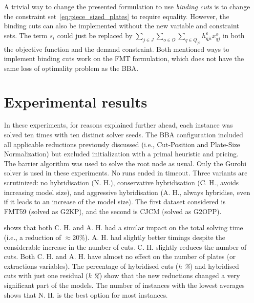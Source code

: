 \documentclass[ppgc,tese,english,formais,babel]{iiufrgs}
\begin{document}
A trivial way to change the presented formulation to use \emph{binding cuts} is to change the constraint set~\eqref{eq:piece_sized_plates} to require equality.
However, the binding cuts can also be implemented without the new variable and constraint sets.
The term \(s_i\) could just be replaced by \(\sum_{j \in J}\sum_{o \in O}\sum_{q \in Q_{jo}} h^o_{qji} x^o_{qj}\) in both the objective function and the demand constraint.
Both mentioned ways to implement binding cuts work on the FMT formulation, which does not have the same loss of optimality problem as the BBA.


\section{Experimental results}

In these experiments, for reasons explained further ahead, each instance was solved ten times with ten distinct solver seeds.
The BBA configuration included all applicable reductions previously discussed (i.e., Cut-Position and Plate-Size Normalization) but excluded initialization with a primal heuristic and pricing.
The barrier algorithm was used to solve the root node as usual.
Only the Gurobi solver is used in these experiments.
No runs ended in timeout.
Three variants are scrutinized: no hybridisation (N. H.), conservative hybridisation (C. H., avoids increasing model size), and aggressive hybridisation (A. H., always hybridise, even if it leads to an increase of the model size).
The first dataset considered is FMT59 (solved as G2KP), and the second is CJCM (solved as G2OPP).

 shows that both C. H. and A. H. had a similar impact on the total solving time (i.e., a reduction of \(\approx\)20\%).
A. H. had slightly better timings despite the considerable increase in the number of cuts.
C. H. slightly reduces the number of cuts.
Both C. H. and A. H. have almost no effect on the number of plates (or extractions variables).
The percentage of hybridised cuts (\emph{h \%}) and hybridised cuts with just one residual (\emph{k \%}) show that the new reductions changed a very significant part of the models.
The number of instances with the lowest averages shows that N. H. is the best option for most instances.
\end{document}
